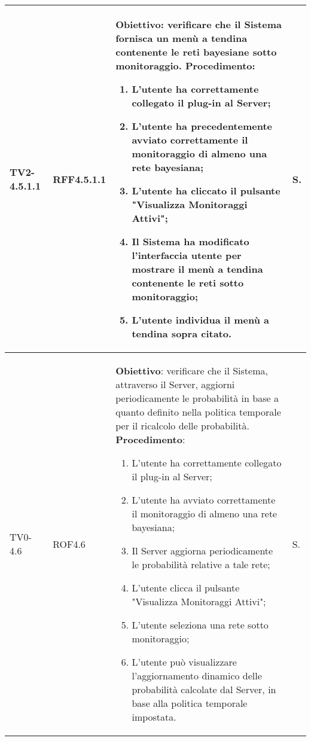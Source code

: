 \begin{longtable}{|C{.15\textwidth}|C{.13\textwidth}|m{.65\textwidth}|C{.08\textwidth}|}
TV2-4.5.1.1 & RFF4.5.1.1 &
	\textbf{Obiettivo}: verificare che il Sistema fornisca un menù a  tendina contenente le reti bayesiane sotto monitoraggio. \newline
	\textbf{Procedimento}:
	\begin{enumerate}
		\item L'utente ha correttamente collegato il plug-in al Server;
		\item L'utente ha precedentemente avviato correttamente il monitoraggio di almeno una rete bayesiana;
		\item L'utente ha cliccato il pulsante "Visualizza Monitoraggi Attivi";
		\item Il Sistema ha modificato l'interfaccia utente per mostrare il menù a tendina contenente le reti sotto monitoraggio;
		\item L'utente individua il menù a tendina sopra citato.
	\end{enumerate}
	& S. \\
\hline

TV0-4.6 & ROF4.6 &
	\textbf{Obiettivo}: verificare che il Sistema, attraverso il Server, aggiorni periodicamente le probabilità in base a quanto definito nella politica temporale per il ricalcolo delle probabilità. \newline
	\textbf{Procedimento}:
	\begin{enumerate}
		\item L'utente ha correttamente collegato il plug-in al Server;
		\item L'utente ha avviato correttamente il monitoraggio di almeno una rete bayesiana;
		\item Il Server aggiorna periodicamente le probabilità relative a tale rete;
		\item L'utente clicca il pulsante "Visualizza Monitoraggi Attivi";
		\item L'utente seleziona una rete sotto monitoraggio;
		\item L'utente può visualizzare l'aggiornamento dinamico delle probabilità calcolate dal Server, in base alla politica temporale impostata.
	\end{enumerate}
	& S. \\
\hline


\end{longtable}
